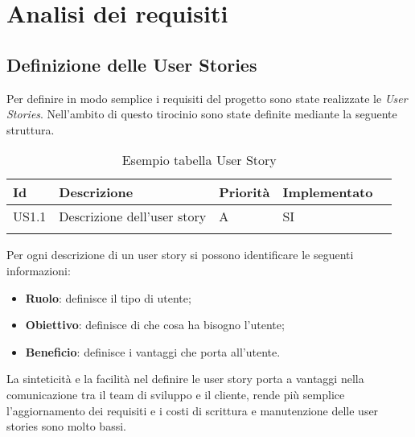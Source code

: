 
\chapter{Analisi dei requisiti}
\label{cap:analisi-requisiti}
\section{Definizione delle User Stories}
Per definire in modo semplice i requisiti del progetto sono state realizzate le \emph{User Stories}. Nell'ambito di questo tirocinio sono state definite mediante la seguente struttura.
\begin{longtable} {
		|>{}p{10mm}| 
		|>{}p{70mm}|
		|>{}p{15mm}|
		|>{}p{25mm}|
		>{}p{0mm}}
	\hline
	\textbf{Id} & \textbf{Descrizione} & \textbf{Priorità} & \textbf{Implementato} \\ \hline
	US1.1 & Descrizione dell'user story & A & SI \\ \hline
	\hline
	\caption{Esempio tabella User Story}
\end{longtable}
\noindent
Per ogni descrizione di un user story si possono identificare le seguenti informazioni:
\begin{itemize}
	\item \textbf{Ruolo}: definisce il tipo di utente;
	\item \textbf{Obiettivo}: definisce di che cosa ha bisogno l'utente;
	\item \textbf{Beneficio}: definisce i vantaggi che porta all'utente.
\end{itemize} 
\noindent
La sinteticità e la facilità nel definire le user story porta a vantaggi nella comunicazione tra il team di sviluppo e il cliente, rende più semplice l'aggiornamento dei requisiti e i costi di scrittura e manutenzione delle user stories sono molto bassi.

